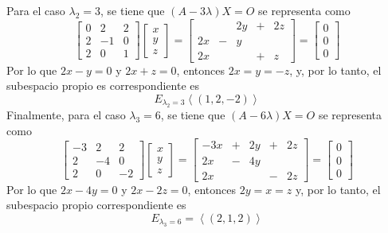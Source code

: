 \begin{solucion}
\begin{enumerate}[$a$)]
  Para el caso $\lambda_2 = 3$, se tiene que $(A-3\lambda)X = O$ se representa como
  \begin{equation*}
   \begin{bmatrix}
    0 &  2 & 2 \\
    2 & -1 & 0 \\
    2 &  0 & 1
   \end{bmatrix}
   \begin{bmatrix}
    x \\ y \\ z
   \end{bmatrix}
   =
   \begin{bmatrix}
       &   & 2y & + & 2z \\
    2x & - &  y &   &    \\
    2x &   &    & + & z
   \end{bmatrix}
   = 
   \begin{bmatrix}
    0 \\ 0 \\ 0
   \end{bmatrix}
  \end{equation*}
  Por lo que $2x-y = 0$ y $2x + z = 0$, entonces $2x = y = -z$, y, por lo tanto, el subespacio propio es correspondiente es
  \begin{equation*}
   E_{\lambda_2 = 3} \left< (1, 2, -2) \right>
  \end{equation*}
  Finalmente, para el caso $\lambda_3 = 6$, se tiene que $(A-6\lambda)X = O$ se representa como
  \begin{equation*}
   \begin{bmatrix}
    -3 &  2 &  2 \\
     2 & -4 &  0 \\
     2 &  0 & -2
   \end{bmatrix}
   \begin{bmatrix}
    x \\ y \\ z
   \end{bmatrix}
   =
   \begin{bmatrix}
    -3x & + & 2y & + & 2z \\
     2x & - & 4y &   &    \\
     2x &   &    & - & 2z
   \end{bmatrix}
   = 
   \begin{bmatrix}
    0 \\ 0 \\ 0
   \end{bmatrix}
  \end{equation*}
  Por lo que $2x - 4y = 0$ y $2x - 2z = 0$, entonces $2y = x = z$ y, por lo tanto, el subespacio propio correspondiente es
  \begin{equation*}
   E_{\lambda_3  = 6} = \left< (2, 1, 2) \right>
  \end{equation*}
  

\end{enumerate}
\end{solucion}
